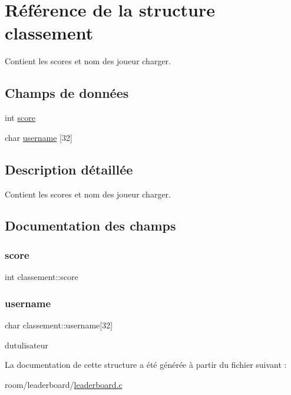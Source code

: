 \hypertarget{structclassement}{}\section{Référence de la structure classement}
\label{structclassement}


Contient les scores et nom des joueur charger.  


\subsection*{Champs de données}
\begin{DoxyCompactItemize}
\item 
int \hyperlink{structclassement_aca80ea3b4f0c358b25721b38e7f5a95e}{score}
\item 
char \hyperlink{structclassement_a82e4991faba5d641921bc0e4b9166f04}{username} \mbox{[}32\mbox{]}
\end{DoxyCompactItemize}


\subsection{Description détaillée}
Contient les scores et nom des joueur charger. 

\subsection{Documentation des champs}
\mbox{\label{structclassement_aca80ea3b4f0c358b25721b38e7f5a95e}} 
\subsubsection{\texorpdfstring{score}{score}}
{\footnotesize\ttfamily int classement\+::score}

\mbox{\label{structclassement_a82e4991faba5d641921bc0e4b9166f04}} 
\subsubsection{\texorpdfstring{username}{username}}
{\footnotesize\ttfamily char classement\+::username\mbox{[}32\mbox{]}}

d\textquotesingle{}utulisateur 

La documentation de cette structure a été générée à partir du fichier suivant \+:\begin{DoxyCompactItemize}
\item 
room/leaderboard/\hyperlink{leaderboard_8c}{leaderboard.\+c}\end{DoxyCompactItemize}
